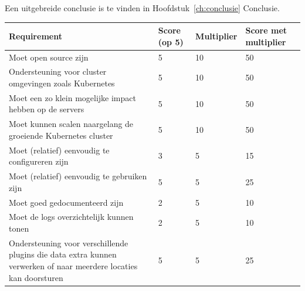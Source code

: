 Een uitgebreide conclusie is te vinden in Hoofdstuk~\ref{ch:conclusie} Conclusie.
\begin{table}[]
    \begin{tabular}{| m{20em} | m{2cm} | m{2cm} | m{2cm} | }
        \hline
        \textbf{Requirement}                                                                                              & \textbf{Score (op 5)} & \textbf{Multiplier} & \textbf{Score met multiplier} \\ \hline
        Moet open source zijn                                                                                             & 5                     & 10                  & 50                            \\ \hline
        Ondersteuning voor cluster omgevingen zoals Kubernetes                                                            & 5                     & 10                  & 50                            \\ \hline
        Moet een zo klein mogelijke impact hebben op de servers                                                           & 5                     & 10                  & 50                            \\ \hline
        Moet kunnen scalen naargelang de groeiende Kubernetes cluster                                                     & 5                     & 10                  & 50                            \\ \hline
        Moet (relatief) eenvoudig te configureren zijn                                                                    & 3                     & 5                   & 15                            \\ \hline
        Moet (relatief) eenvoudig te gebruiken zijn                                                                       & 5                     & 5                   & 25                            \\ \hline
        Moet goed gedocumenteerd zijn                                                                                     & 2                     & 5                   & 10                            \\ \hline
        Moet de logs overzichtelijk kunnen tonen                                                                          & 2                     & 5                   & 10                            \\ \hline
        Ondersteuning voor verschillende plugins die data extra kunnen verwerken of naar meerdere locaties kan doorsturen & 5                     & 5                   & 25                            \\ \hline

\end{tabular}
\end{table}
